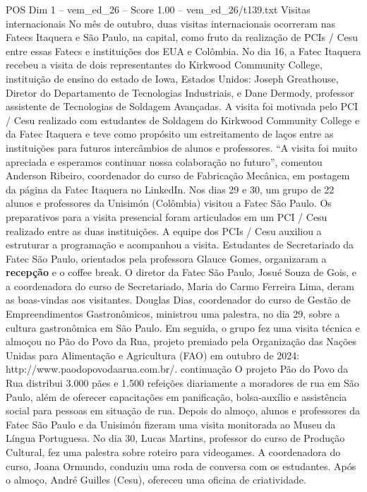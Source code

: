 \begin{textsample}{POS Dim 1 – vem\_ed\_26 – Score 1.00 – vem\_ed\_26/t139.txt}  \label{ex:f1_pos_050}
Visitas internacionais No mês de outubro, duas visitas internacionais ocorreram nas Fatecs Itaquera e São Paulo, na capital, como fruto da realização de PCIs / Cesu entre essas Fatecs e instituições dos EUA e Colômbia.
No dia 16, a Fatec Itaquera recebeu a visita de dois representantes do Kirkwood Community College, instituição de ensino do estado de Iowa, Estados Unidos: Joseph Greathouse, Diretor do Departamento de Tecnologias Industriais, e Dane Dermody, professor assistente de Tecnologias de Soldagem Avançadas.
A visita foi motivada pelo PCI / Cesu realizado com estudantes de Soldagem do Kirkwood Community College e da Fatec Itaquera e teve como propósito um estreitamento de laços entre as instituições para futuros intercâmbios de alunos e professores. “A visita foi muito apreciada e esperamos continuar nossa colaboração no futuro”, comentou Anderson Ribeiro, coordenador do curso de Fabricação Mecânica, em postagem da página da Fatec Itaquera no LinkedIn.
Nos dias 29 e 30, um grupo de 22 alunos e professores da Unisimón (Colômbia) visitou a Fatec São Paulo.
Os preparativos para a visita presencial foram articulados em um PCI / Cesu realizado entre as duas instituições.
A equipe dos PCIs / Cesu auxiliou a estruturar a programação e acompanhou a visita.
Estudantes de Secretariado da Fatec São Paulo, orientados pela professora Glauce Gomes, organizaram a \textbf{recepção} e o coffee break.
O diretor da Fatec São Paulo, Josué Souza de Gois, e a coordenadora do curso de Secretariado, Maria do Carmo Ferreira Lima, deram as boas-vindas aos visitantes.
Douglas Dias, coordenador do curso de Gestão de Empreendimentos Gastronômicos, ministrou uma palestra, no dia 29, sobre a cultura gastronômica em São Paulo.
Em seguida, o grupo fez uma visita técnica e almoçou no Pão do Povo da Rua, projeto premiado pela Organização das Nações Unidas para Alimentação e Agricultura (FAO) em outubro de 2024: http://www.paodopovodaarua.com.br/. continuação O projeto Pão do Povo da Rua distribui 3.000 pães e 1.500 refeições diariamente a moradores de rua em São Paulo, além de oferecer capacitações em panificação, bolsa-auxílio e assistência social para pessoas em situação de rua.
Depois do almoço, alunos e professores da Fatec São Paulo e da Unisimón fizeram uma visita monitorada ao Museu da Língua Portuguesa.
No dia 30, Lucas Martins, professor do curso de Produção Cultural, fez uma palestra sobre roteiro para videogames.
A coordenadora do curso, Joana Ormundo, conduziu uma roda de conversa com os estudantes.
Após o almoço, André Guilles (Cesu), ofereceu uma oficina de criatividade.

\end{textsample}
